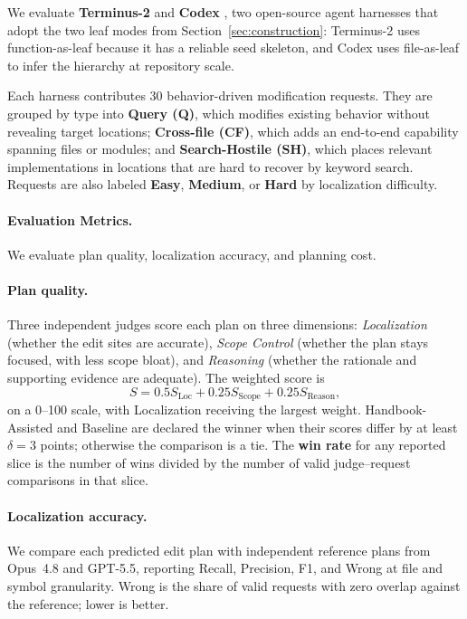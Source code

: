 \documentclass[]{ailab}
\newcommand{\hbsmall}{\textsf{function-as-leaf}}
\newcommand{\hblarge}{\textsf{file-as-leaf}}
\begin{document}
We evaluate \textbf{Terminus-2} \citep{merrill2026terminalbench} and
\textbf{Codex} \citep{openai2025codex}, two open-source agent harnesses that
adopt the two leaf modes from Section~\ref{sec:construction}:
Terminus-2 uses \hbsmall{} because it has a reliable seed skeleton, and Codex
uses \hblarge{} to infer the hierarchy at repository scale.

Each harness contributes 30 behavior-driven modification requests. They are
grouped by type into \textbf{Query (Q)}, which modifies existing behavior
without revealing target locations; \textbf{Cross-file (CF)}, which adds an
end-to-end capability spanning files or modules; and \textbf{Search-Hostile
(SH)}, which places relevant implementations in locations that are hard to
recover by keyword search. Requests are also labeled \textbf{Easy},
\textbf{Medium}, or \textbf{Hard} by localization difficulty.

\paragraph{\textbf{Evaluation Metrics.}}

We evaluate plan quality, localization accuracy, and planning cost.

\paragraph{Plan quality.}
Three independent judges score each plan on three dimensions:
\emph{Localization} (whether the edit sites are accurate),
\emph{Scope Control} (whether the plan stays focused, with less scope bloat),
and \emph{Reasoning} (whether the rationale and supporting evidence are
adequate). The weighted score is
\begin{equation}
S=
0.5S_{\mathrm{Loc}}
+0.25S_{\mathrm{Scope}}
+0.25S_{\mathrm{Reason}},
\end{equation}
on a 0--100 scale, with Localization receiving the largest weight.
Handbook-Assisted and Baseline are declared the winner when their scores differ
by at least $\delta=3$ points; otherwise the comparison is a tie. The
\textbf{win rate} for any reported slice is the number of wins divided by the
number of valid judge--request comparisons in that slice.

\paragraph{Localization accuracy.}
We compare each predicted edit plan with independent reference plans from
Opus~4.8 and GPT-5.5, reporting Recall, Precision, F1, and Wrong at
file and symbol granularity. Wrong is the share of valid requests with zero
overlap against the reference; lower is better.
\end{document}
